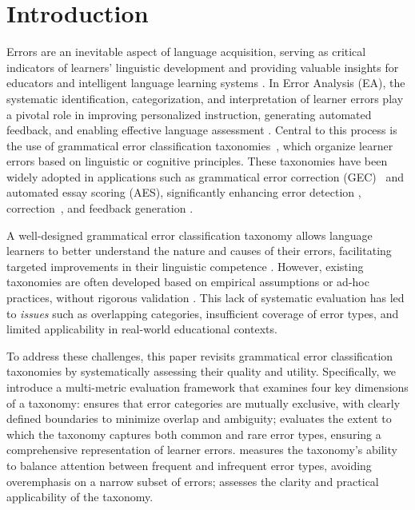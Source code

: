 \section{Introduction}

Errors are an inevitable aspect of language acquisition, serving as critical indicators of learners' linguistic development and providing valuable insights for educators and intelligent language learning systems \citep{l10,l11,l12,liu2022we,li2022past,li2023towards,li2024llms}. In Error Analysis (EA), the systematic identification, categorization, and interpretation of learner errors play a pivotal role in improving personalized instruction, generating automated feedback, and enabling effective language assessment \citep{l13,l14,language_two,li2022learning,li2023effectiveness}. Central to this process is the use of grammatical error classification taxonomies~\citep{ma2022linguistic,excgec,enhancing}, which organize learner errors based on linguistic or cognitive principles. These taxonomies have been widely adopted in applications such as grammatical error correction (GEC)~\cite{li2024rethinkingroleslargelanguage,ye-etal-2023-mixedit,ye-etal-2023-system,li2025correct} and automated essay scoring (AES), significantly enhancing error detection \cite{huang-etal-2023-frustratingly,zhang2023contextual}, correction~\cite{ye2022focus}, and feedback generation \citep{l15,l16}.

A well-designed grammatical error classification taxonomy allows language learners to better understand the nature and causes of their errors, facilitating targeted improvements in their linguistic competence \cite{ye2025position}. However, existing taxonomies are often developed based on empirical assumptions or ad-hoc practices, without rigorous validation \citep{TEGA, errant}. This lack of systematic evaluation has led to \textit{issues} such as overlapping categories, insufficient coverage of error types, and limited applicability in real-world educational contexts.

To address these challenges, this paper revisits grammatical error classification taxonomies by systematically assessing their quality and utility. Specifically, we introduce a multi-metric evaluation framework that examines four key dimensions of a taxonomy:  \textit{\Exclusivity} ensures that error categories are mutually exclusive, with clearly defined boundaries to minimize overlap and ambiguity;
 \textit{\Coverage} evaluates the extent to which the taxonomy captures both common and rare error types, ensuring a comprehensive representation of learner errors.  \textit{\Balance} measures the taxonomy’s ability to balance attention between frequent and infrequent error types, avoiding overemphasis on a narrow subset of errors;  \textit{\Usability} assesses the clarity and practical applicability of the taxonomy.

